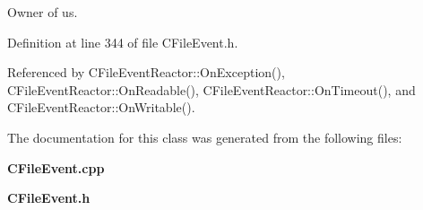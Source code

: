 Owner of us.



Definition at line 344 of file CFile\-Event.h.

Referenced by CFile\-Event\-Reactor::On\-Exception(), CFile\-Event\-Reactor::On\-Readable(), CFile\-Event\-Reactor::On\-Timeout(), and CFile\-Event\-Reactor::On\-Writable().

The documentation for this class was generated from the following files:\begin{CompactItemize}
\item 
{\bf CFile\-Event.cpp}\item 
{\bf CFile\-Event.h}\end{CompactItemize}
